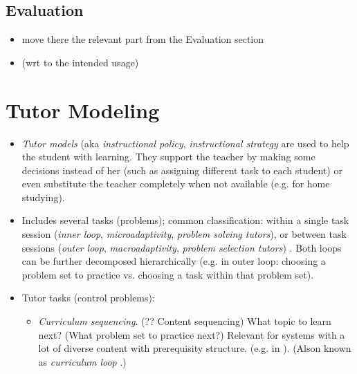 \subsection{Evaluation}

\begin{itemize}
\item move there the relevant part from the Evaluation section
\item (wrt to the intended usage)
\end{itemize}




\section{Tutor Modeling}

\begin{itemize}
\item \emph{Tutor models} (aka \emph{instructional policy}, \emph{instructional
  strategy} are used to help the student with learning.
  They support the teacher by making some decisions instead of her
  (such as assigning different task to each student)
  or even substitute the teacher completely when not available
  (e.g. for home studying).
\item Includes several tasks (problems); common classification:
  within a single task session
  (\emph{inner loop}, \emph{microadaptivity}, \emph{problem solving tutors}),
  or between task sessions
  (\emph{outer loop}, \emph{macroadaptivity}, \emph{problem selection tutors})
  \cite{its-learner-models}.
  Both loops can be further decomposed hierarchically
  (e.g. in outer loop: choosing a problem set to practice vs. choosing a task
  within that problem set).
\item Tutor tasks (control problems):
\begin{itemize}
\item \emph{Curriculum sequencing}. (?? Content sequencing)
  What topic to learn next? (What problem set to practice next?)
  Relevant for systems with a lot of diverse content with prerequisity structure.
  (e.g. in \cite{its-programming}).  %
  (Alson known as \emph{curriculum loop} \cite{its-learner-models}.)

\end{itemize}
\end{itemize}
